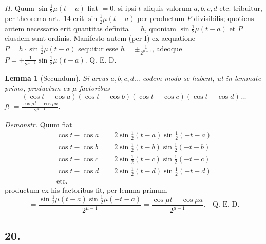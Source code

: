 \documentclass[12pt,a4paper]{article}
\theoremstyle{plain}
\newtheorem*{lemma}{Lemma}
\begin{document}
\textit{II.} Quum $\sin\frac{1}{2}\mu(t-a)$ fiat $=0$, si ipsi $t$ aliquis valorum $a, b, c, d$ etc. tribuitur, per theorema art.\ 14 erit $\sin\frac{1}{2}\mu(t-a)$ per productum $P$ divisibilis; quotiens autem necessario erit quantitas definita $=h$, quoniam $\sin\frac{1}{2}\mu(t-a)$ et $P$
eiusdem sunt ordinis. Manifesto autem (per I) ex aequatione
$P = h\cdot\sin\frac{1}{2}\mu(t-a)$ sequitur esse $h = \pm\frac{1}{2^{\mu-1}}$, adeoque
$P = \pm\frac{1}{2^{\mu-1}}\sin\frac{1}{2}\mu(t-a)$. Q. E. D.

\begin{lemma}[Secundum] Si arcus $a, b, c, d\ldots$ eodem modo se habent, ut in lemmate primo, productum
ex $\mu$ factoribus
\[
(\cos t - \cos a)(\cos t - \cos b)(\cos t - \cos c)(\cos t - \cos d)\ldots
\]
ft $= \frac{\cos\mu t - \cos\mu a}{2^{\mu-1}}$.
\end{lemma}

\textit{Demonstr.} Quum fiat
\begin{align*}
\cos t - \cos a &= 2\sin\frac{1}{2}(t-a)\sin\frac{1}{2}(-t-a)\\
\cos t - \cos b &= 2\sin\frac{1}{2}(t-b)\sin\frac{1}{2}(-t-b)\\
\cos t - \cos c &= 2\sin\frac{1}{2}(t-c)\sin\frac{1}{2}(-t-c)\\
\cos t - \cos d &= 2\sin\frac{1}{2}(t-d)\sin\frac{1}{2}(-t-d)\\
\text{etc.}
\end{align*}
productum ex his factoribus fit, per lemma primum
\[
= \frac{\sin\frac{1}{2}\mu(t-a)\sin\frac{1}{2}\mu(-t-a)}{2^{\mu-1}} = \frac{\cos\mu t - \cos\mu a}{2^{\mu-1}}. \quad\text{Q. E. D.}
\]
\subsection*{20.}
\end{document}
